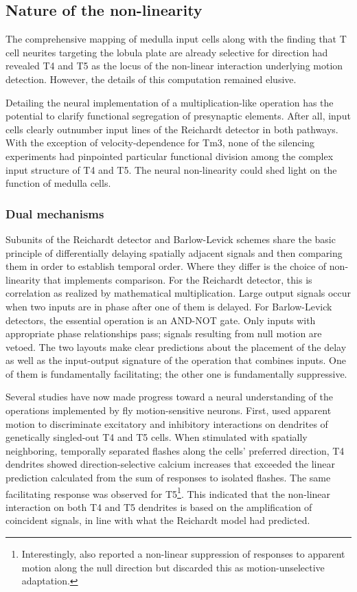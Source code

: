 \subsection{Nature of the non-linearity}
The comprehensive mapping of medulla input cells along with the finding that T cell neurites targeting the lobula plate are already selective for direction had revealed T4 and T5 as the locus of the non-linear interaction underlying motion detection. However, the details of this computation remained elusive.

Detailing the neural implementation of a multiplication-like operation has the potential to clarify functional segregation of presynaptic elements. After all, input cells clearly outnumber input lines of the Reichardt detector in both pathways. With the exception of velocity-dependence for Tm3, none of the silencing experiments had pinpointed particular functional division among the complex input structure of T4 and T5. The neural non-linearity could shed light on the function of medulla cells.

\subsubsection{Dual mechanisms}
Subunits of the Reichardt detector and Barlow-Levick schemes share the basic principle of differentially delaying spatially adjacent signals and then comparing them in order to establish temporal order. Where they differ is the choice of non-linearity that implements comparison. For the Reichardt detector, this is correlation as realized by mathematical multiplication. Large output signals occur when two inputs are in phase after one of them is delayed. For Barlow-Levick detectors, the essential operation is an AND-NOT gate. Only inputs with appropriate phase relationships pass; signals resulting from null motion are vetoed. The two layouts make clear predictions about the placement of the delay as well as the input-output signature of the operation that combines inputs. One of them is fundamentally facilitating; the other one is fundamentally suppressive.

Several studies have now made progress toward a neural understanding of the operations implemented by fly motion-sensitive neurons. First, \citet{Fisher:2015jo} used apparent motion to discriminate excitatory and inhibitory interactions on dendrites of genetically singled-out T4 and T5 cells. When stimulated with spatially neighboring, temporally separated flashes along the cells' preferred direction, T4 dendrites showed direction-selective calcium increases that exceeded the linear prediction calculated from the sum of responses to isolated flashes. The same facilitating response was observed for T5\footnote{Interestingly, \citet{Fisher:2015jo} also reported a non-linear suppression of responses to apparent motion along the null direction but discarded this as motion-unselective adaptation.}. This indicated that the non-linear interaction on both T4 and T5 dendrites is based on the amplification of coincident signals, in line with what the Reichardt model had predicted.

